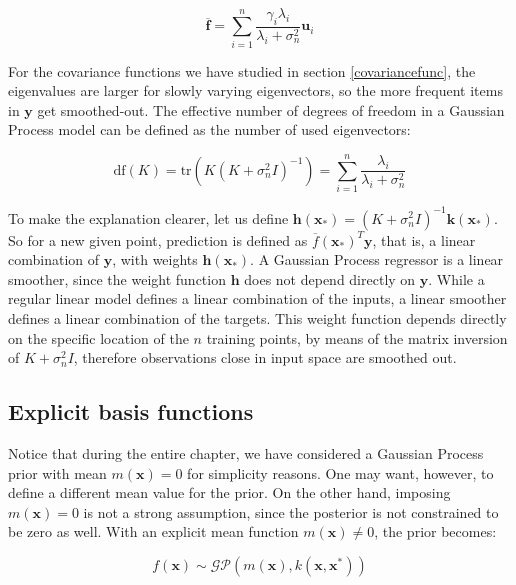\documentclass[10pt,a4paper,twoside]{book}
\begin{document}
\begin{equation}
\overline{\boldsymbol{f}} = \sum_{i=1}^n \dfrac{\gamma_i \lambda_i}{\lambda_i + \sigma^2_n}\boldsymbol{u}_i
\end{equation}

For the covariance functions we have studied in section \ref{covariancefunc}, the eigenvalues are larger for slowly varying eigenvectors, so the more frequent items in $\boldsymbol{y}$ get smoothed-out. The effective number of degrees of freedom in a Gaussian Process model can be defined as the number of used eigenvectors:

\begin{equation}
\mathrm{df}(K) = \mathrm{tr}(K(K + \sigma_n^2 I)^{-1}) = \sum_{i=1}^n\dfrac{\lambda_i}{\lambda_i + \sigma_n^2}
\end{equation}

To make the explanation clearer, let us define $\boldsymbol{h}(\boldsymbol{x}_*) = (K + \sigma_n^2 I)^{-1}\boldsymbol{k}(\boldsymbol{x}_*)$. So for a new given point, prediction is defined as $\overline{f}(\boldsymbol{x}_*)^T \boldsymbol{y}$, that is, a linear combination of $\boldsymbol{y}$, with weights $\boldsymbol{h}(\boldsymbol{x}_*)$. A Gaussian Process regressor is a linear smoother, since the weight function $\boldsymbol{h}$ does not depend directly on $\boldsymbol{y}$. While a regular linear model defines a linear combination of the inputs, a linear smoother defines a linear combination of the targets. This weight function depends directly on the specific location of the $n$ training points, by means of the matrix inversion of $K + \sigma_n^2 I$, therefore observations close in input space are smoothed out.

\subsection{Explicit basis functions}

Notice that during the entire chapter, we have considered a Gaussian Process prior with mean $m(\boldsymbol{x}) = 0$ for simplicity reasons. One may want, however, to define a different mean value for the prior. On the other hand, imposing $m(\boldsymbol{x}) = 0$ is not a strong assumption, since the posterior is not constrained to be zero as well. With an explicit mean function $m(\boldsymbol{x}) \neq 0$, the prior becomes:

\begin{equation}
f(\boldsymbol{x}) \sim \mathcal{G}\mathcal{P}\left(m(\boldsymbol{x}), k(\boldsymbol{x}, \boldsymbol{x^*})\right)
\end{equation}
\end{document}

